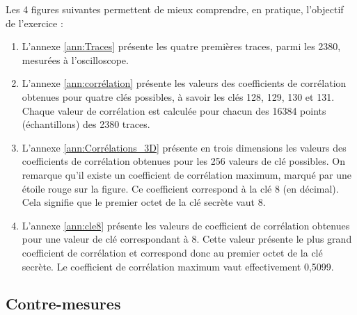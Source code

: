 \documentclass[10pt, oneside, a4paper]{article}
\begin{document}
\hspace{-0.5 cm}Les 4 figures suivantes permettent de mieux comprendre, en pratique, l'objectif de l'exercice :
\begin{enumerate}
\item L'annexe \ref{ann:Traces} présente les quatre premières traces, parmi les 2380, mesurées à l'oscilloscope.
\item L'annexe \ref{ann:corrélation} présente les valeurs des coefficients de corrélation obtenues pour quatre clés possibles, à savoir les clés 128, 129, 130 et 131. Chaque valeur de corrélation est calculée pour chacun des 16384 points (échantillons) des 2380 traces. 
\item L'annexe \ref{ann:Corrélations_3D} présente en trois dimensions les valeurs des coefficients de corrélation obtenues pour les 256 valeurs de clé possibles. On remarque qu'il existe un coefficient de corrélation maximum, marqué par une étoile rouge sur la figure. Ce coefficient correspond à la clé 8 (en décimal). Cela signifie que le premier octet de la clé secrète vaut 8. 
\item L'annexe \ref{ann:cle8} présente les valeurs de coefficient de corrélation obtenues pour une valeur de clé correspondant à 8. Cette valeur présente le plus grand coefficient de corrélation et correspond donc au premier octet de la clé secrète. Le coefficient de corrélation maximum vaut effectivement 0,5099.
\end{enumerate}



\newpage
\subsection{Contre-mesures}
\label{sec:contre-mesures}
\end{document}
